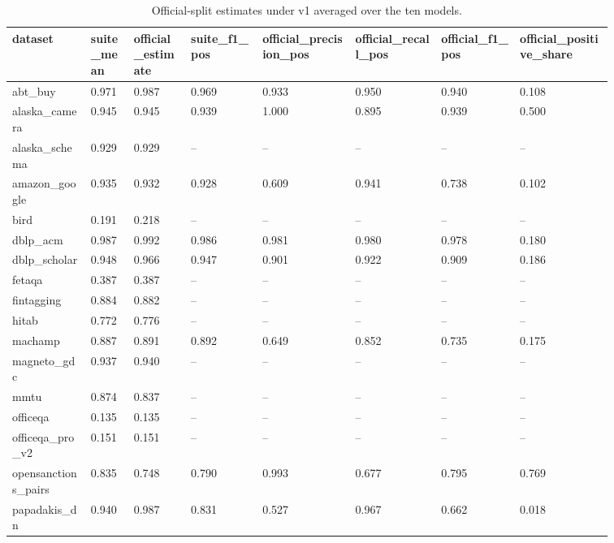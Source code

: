 \begin{table}[htbp]
\centering\tiny
\caption{Official-split estimates under v1 averaged over the ten models.}
\label{tab:official_split_by_dataset}
\setlength{\tabcolsep}{3pt}
\begin{tabular}{p{0.112\linewidth}p{0.063\linewidth}p{0.081\linewidth}p{0.104\linewidth}p{0.130\linewidth}p{0.123\linewidth}p{0.112\linewidth}p{0.133\linewidth}}
\toprule
dataset & suite\_\allowbreak{}mean & official\_\allowbreak{}estimate & suite\_\allowbreak{}f1\_\allowbreak{}pos & official\_\allowbreak{}precision\_\allowbreak{}pos & official\_\allowbreak{}recall\_\allowbreak{}pos & official\_\allowbreak{}f1\_\allowbreak{}pos & official\_\allowbreak{}positive\_\allowbreak{}share \\
\midrule
abt\_\allowbreak{}buy & 0.971 & 0.987 & 0.969 & 0.933 & 0.950 & 0.940 & 0.108 \\
alaska\_\allowbreak{}camera & 0.945 & 0.945 & 0.939 & 1.000 & 0.895 & 0.939 & 0.500 \\
alaska\_\allowbreak{}schema & 0.929 & 0.929 & -- & -- & -- & -- & -- \\
amazon\_\allowbreak{}google & 0.935 & 0.932 & 0.928 & 0.609 & 0.941 & 0.738 & 0.102 \\
bird & 0.191 & 0.218 & -- & -- & -- & -- & -- \\
dblp\_\allowbreak{}acm & 0.987 & 0.992 & 0.986 & 0.981 & 0.980 & 0.978 & 0.180 \\
dblp\_\allowbreak{}scholar & 0.948 & 0.966 & 0.947 & 0.901 & 0.922 & 0.909 & 0.186 \\
fetaqa & 0.387 & 0.387 & -- & -- & -- & -- & -- \\
fintagging & 0.884 & 0.882 & -- & -- & -- & -- & -- \\
hitab & 0.772 & 0.776 & -- & -- & -- & -- & -- \\
machamp & 0.887 & 0.891 & 0.892 & 0.649 & 0.852 & 0.735 & 0.175 \\
magneto\_\allowbreak{}gdc & 0.937 & 0.940 & -- & -- & -- & -- & -- \\
mmtu & 0.874 & 0.837 & -- & -- & -- & -- & -- \\
officeqa & 0.135 & 0.135 & -- & -- & -- & -- & -- \\
officeqa\_\allowbreak{}pro\_\allowbreak{}v2 & 0.151 & 0.151 & -- & -- & -- & -- & -- \\
opensanctions\_\allowbreak{}pairs & 0.835 & 0.748 & 0.790 & 0.993 & 0.677 & 0.795 & 0.769 \\
papadakis\_\allowbreak{}dn & 0.940 & 0.987 & 0.831 & 0.527 & 0.967 & 0.662 & 0.018 \\

\end{tabular}
\end{table}
